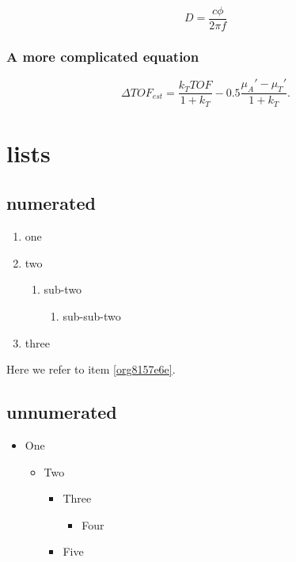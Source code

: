 \begin{equation}
\label{eq:orgb1b8cbd}
D = \frac{c\phi}{2\pi f}
\end{equation}

\subsubsection{A more complicated equation}
\label{sec:org4748a9a}

\begin{equation}
\Delta TOF_{est} = \frac{k_T TOF}{1+k_T } - 0.5 \frac{\mu_A' - \mu_T'}{1+k_T}.
\end{equation}

\section{lists}
\label{sec:org2667222}
\subsection{numerated}
\label{sec:orgfcecd3b}
\begin{enumerate}
\item one
\item two
\begin{enumerate}
\item sub-two
\begin{enumerate}
\item sub-sub-two
\end{enumerate}
\end{enumerate}
\item \label{org8157e6e}three
\end{enumerate}

Here we refer to item \ref{org8157e6e}.

\subsection{unnumerated}
\label{sec:org67514c8}
\begin{itemize}
\item One
\begin{itemize}
\item Two
\begin{itemize}
\item Three
\begin{itemize}
\item Four
\end{itemize}
\item Five
\end{itemize}
\end{itemize}
\end{itemize}

